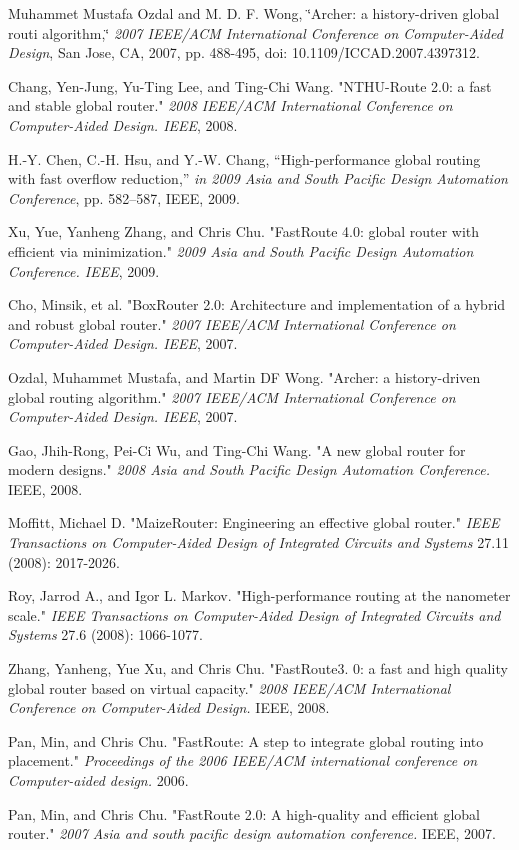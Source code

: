 \documentclass[conference]{IEEEtran}
\begin{document}
\begin{thebibliography}{00}

     Muhammet Mustafa Ozdal and M. D. F. Wong, \char`\"{}Archer: a history-driven global routi algorithm,\char`\"{} \textit{2007
    IEEE/ACM International Conference on Computer-Aided Design}, San Jose,
    CA, 2007, pp. 488-495, doi: 10.1109/ICCAD.2007.4397312.
    

     Chang, Yen-Jung, Yu-Ting Lee, and Ting-Chi Wang. "NTHU-Route 2.0: a fast and stable global router." \textit{2008 IEEE/ACM International Conference on Computer-Aided Design. IEEE}, 2008.

     H.-Y. Chen, C.-H. Hsu, and Y.-W. Chang, “High-performance global routing with fast overflow reduction,” \textit{in 2009 Asia and South Pacific Design Automation Conference}, pp. 582–587, IEEE, 2009.

     Xu, Yue, Yanheng Zhang, and Chris Chu. "FastRoute 4.0: global router with efficient via minimization." \textit{2009 Asia and South Pacific Design Automation Conference. IEEE}, 2009.

     Cho, Minsik, et al. "BoxRouter 2.0: Architecture and implementation of a hybrid and robust global router." \textit{2007 IEEE/ACM International Conference on Computer-Aided Design. IEEE}, 2007.

     Ozdal, Muhammet Mustafa, and Martin DF Wong. "Archer: a history-driven global routing algorithm." \textit{2007 IEEE/ACM International Conference on Computer-Aided Design. IEEE}, 2007.

     Gao, Jhih-Rong, Pei-Ci Wu, and Ting-Chi Wang. "A new global router for modern designs." \textit{2008 Asia and South Pacific Design Automation Conference.} IEEE, 2008.

     Moffitt, Michael D. "MaizeRouter: Engineering an effective global router." \textit{IEEE Transactions on Computer-Aided Design of Integrated Circuits and Systems} 27.11 (2008): 2017-2026.

     Roy, Jarrod A., and Igor L. Markov. "High-performance routing at the nanometer scale." \textit{IEEE Transactions on Computer-Aided Design of Integrated Circuits and Systems} 27.6 (2008): 1066-1077.

     Zhang, Yanheng, Yue Xu, and Chris Chu. "FastRoute3. 0: a fast and high quality global router based on virtual capacity." \textit{2008 IEEE/ACM International Conference on Computer-Aided Design.} IEEE, 2008.

     Pan, Min, and Chris Chu. "FastRoute: A step to integrate global routing into placement." \textit{Proceedings of the 2006 IEEE/ACM international conference on Computer-aided design.} 2006.

     Pan, Min, and Chris Chu. "FastRoute 2.0: A high-quality and efficient global router." \textit{2007 Asia and south pacific design automation conference.} IEEE, 2007.

\end{thebibliography}
\end{document}

